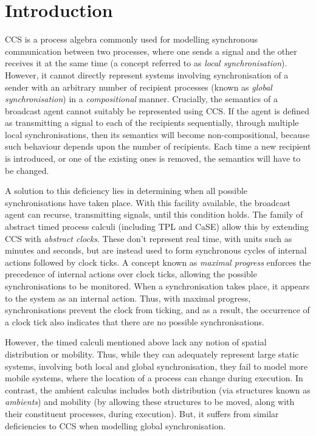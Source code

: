 \chapter{Introduction}
\label{introduction}

CCS \cite{milner:ccs} is a process algebra commonly used for
modelling synchronous communication between two processes, where one
sends a signal and the other receives it at the same time (a concept
referred to as \emph{local synchronisation}).  However, it cannot
directly represent systems involving synchronisation of a sender with
an arbitrary number of recipient processes (known as \emph{global
  synchronisation}) in a \emph{compositional} manner.  Crucially, the
semantics of a broadcast agent cannot suitably be represented using
CCS.  If the agent is defined as transmitting a signal to each of the
recipients sequentially, through multiple local synchronisations, then
its semantics will become non-compositional, because such behaviour
depends upon the number of recipients.  Each time a new recipient is
introduced, or one of the existing ones is removed, the semantics will
have to be changed.

A solution to this deficiency lies in determining when all possible
synchronisations have taken place.  With this facility available, the
broadcast agent can recurse, transmitting signals, until this
condition holds. The family of abstract timed process calculi
(including TPL\cite{hennessy:tpl} and CaSE\cite{CaSE}) allow this by
extending CCS with \emph{abstract clocks}.  These don't represent real
time, with units such as minutes and seconds, but are instead used to
form synchronous cycles of internal actions followed by clock ticks.
A concept known as \emph{maximal progress} enforces the precedence of
internal actions over clock ticks, allowing the possible
synchronisations to be monitored.  When a synchronisation takes place,
it appears to the system as an internal action.  Thus, with maximal
progress, synchronisations prevent the clock from ticking, and as a
result, the occurrence of a clock tick also indicates that there are
no possible synchronisations.

However, the timed calculi mentioned above lack any notion of spatial
distribution or mobility. Thus, while they can adequately represent
large static systems, involving both local and global synchronisation,
they fail to model more mobile systems, where the location of a
process can change during execution.  In contrast, the ambient
calculus \cite{amb} includes both distribution (via structures known
as \emph{ambients}) and mobility (by allowing these structures to be
moved, along with their constituent processes, during execution). But,
it suffers from similar deficiencies to CCS when modelling global
synchronisation.

